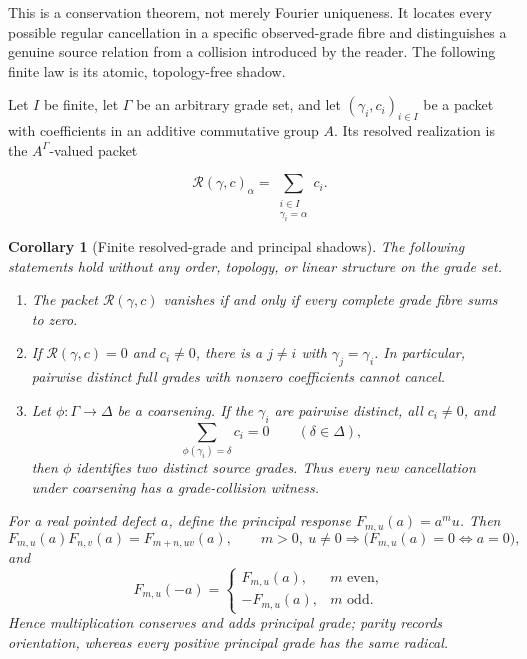 \documentclass[11pt]{article}
\newtheorem{corollary}[theorem]{Corollary}
\theoremstyle{definition}
\theoremstyle{remark}
\begin{document}
This is a conservation theorem, not merely Fourier uniqueness.  It locates
every possible regular cancellation in a specific observed-grade fibre and
distinguishes a genuine source relation from a collision introduced by the
reader.  The following finite law is its atomic, topology-free shadow.

Let \(I\) be finite, let \(\Gamma\) be an arbitrary grade set, and let
\((\gamma_i,c_i)_{i\in I}\) be a packet with coefficients in an additive
commutative group \(A\).  Its resolved realization is the \(A^\Gamma\)-valued
packet

\[
                 \mathcal R(\gamma,c)_\alpha
                 =\sum_{\substack{i\in I\\\gamma_i=\alpha}}c_i.
\tag{2.R0}\label{eq:resolved-grade-packet}
\]

\begin{corollary}[Finite resolved-grade and principal shadows]
\label{thm:resolved-grade-conservation}
The following statements hold without any order, topology, or linear
structure on the grade set.

\begin{enumerate}[label=\textup{(\roman*)},leftmargin=2.4em]
\item The packet \(\mathcal R(\gamma,c)\) vanishes if and only if every
      complete grade fibre sums to zero.
\item If \(\mathcal R(\gamma,c)=0\) and \(c_i\ne0\), there is a
      \(j\ne i\) with \(\gamma_j=\gamma_i\).  In particular, pairwise
      distinct full grades with nonzero coefficients cannot cancel.
\item Let \(\phi:\Gamma\to\Delta\) be a coarsening.  If the \(\gamma_i\)
      are pairwise distinct, all \(c_i\ne0\), and
      \[
        \sum_{\phi(\gamma_i)=\delta}c_i=0
        \qquad(\delta\in\Delta),
      \tag{2.R1}\label{eq:coarsened-grade-zero}
      \]
      then \(\phi\) identifies two distinct source grades.  Thus every new
      cancellation under coarsening has a grade-collision witness.
\end{enumerate}

For a real pointed defect \(a\), define the principal response
\(F_{m,u}(a)=a^m u\).  Then
\[
 F_{m,u}(a)F_{n,v}(a)=F_{m+n,uv}(a),\qquad
 m>0,\ u\ne0\Longrightarrow
 \bigl(F_{m,u}(a)=0\Longleftrightarrow a=0\bigr),
\tag{2.R2}\label{eq:principal-degree-law}
\]
and
\[
 F_{m,u}(-a)=
 \begin{cases}
 F_{m,u}(a),&m\text{ even},\\
 -F_{m,u}(a),&m\text{ odd}.
 \end{cases}
\tag{2.R3}\label{eq:principal-parity-law}
\]
Hence multiplication conserves and adds principal grade; parity records
orientation, whereas every positive principal grade has the same radical.
\end{corollary}
\end{document}
